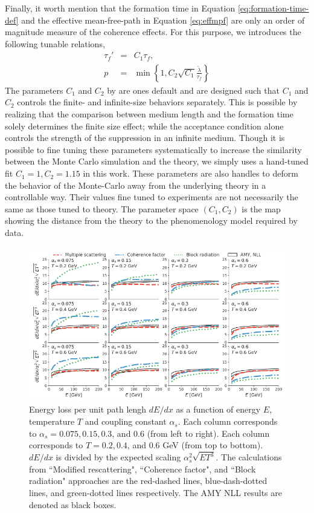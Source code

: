 \documentclass[aps, prc, reprint, amsmath, groupedaddress, nofootinbib]{revtex4-1}
\begin{document}
Finally, it worth mention that the formation time in Equation \ref{eq:formation-time-def} and the effective mean-free-path in Equation \ref{eq:effmpf} are only an order of magnitude measure of the coherence effects. 
For this purpose, we introduces the following tunable relations,
\begin{eqnarray}\label{eq:tune}
\nonumber
\tau_f' &=& C_1 \tau_f, \\
p &=& \min\left\{1, C_2\sqrt{C_1} \frac{\tilde{\lambda}}{\tau_f}\right\}
\end{eqnarray}
The parameters $C_1$ and $C_2$ by are ones default and are designed such that $C_1$ and $C_2$ controls the finite- and infinite-size behaviors separately. 
This is possible by realizing that the comparison between medium length and the formation time solely determines the finite size effect; while the acceptance condition alone controls the strength of the suppression in an infinite medium.
Though it is possible to fine tuning these parameters systematically to increase the similarity between the Monte Carlo simulation and the theory, we simply uses a hand-tuned fit $C_1 = 1, C_2 = 1.15$ in this work.
These parameters are also handles to deform the behavior of the Monte-Carlo away from the underlying theory in a controllable way.
Their values fine tuned to experiments are not necessarily the same as those tuned to theory. 
The parameter space $(C_1, C_2)$ is the map showing the distance from the theory to the phenomenology model required by data.

\begin{figure}
\includegraphics[width=\textwidth]{Eloss_infinite.pdf}
\caption{Energy loss per unit path lengh $dE/dx$ as a function of energy $E$, temperature $T$ and coupling constant $\alpha_s$. Each column corresponds to $\alpha_s = 0.075, 0.15, 0.3$, and $0.6$ (from left to right). Each column corresponds to $T = 0.2, 0.4$, and $0.6$ GeV (from top to bottom). $dE/dx$ is divided by the expected scaling $\alpha_s^2 \sqrt{ET^3}$. The calculations from ``Modified rescattering", ``Coherence factor", and ``Block radiation" approaches are the red-dashed lines, blue-dash-dotted lines, and green-dotted lines respectively. The AMY NLL results are denoted as black boxes.}
\label{fig:eloss-inf}
\end{figure}
\end{document}
